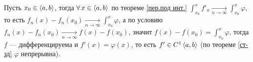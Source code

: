 \begin{prf} %
		Пусть $x_0 \in \left<a, b\right>$, тогда $\forall \, x \in \left<a, b\right>$ по теореме \ref{пер.под инт.} $\int_{x_0}^{x} f'_n \xrightarrow[n \to \infty]{} \int_{x_0}^{x} \varphi$, то есть $f_n(x) - f_n(x_0) \xrightarrow[n \to \infty]{} \int_{x_0}^{x} \varphi$, а по условию $f_n(x) - f_n(x_0) \xrightarrow[n \to \infty]{} f(x) - f(x_0)$, значит $f(x) - f(x_0) = \int_{x_0}^{x} \varphi$, \linebreak тогда  $f$ --- \smallskip дифференцируема и $f'(x) = \varphi(x)$, то есть $f' \in C^1 \left<a, b\right>$ (по теореме \ref{ст-зд} $\varphi$ непрерывна).
\end{prf} %
